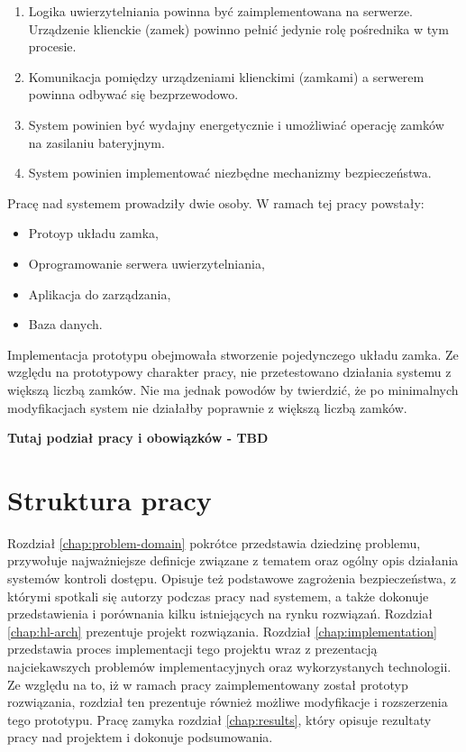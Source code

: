 		\begin{enumerate}
		    \item Logika uwierzytelniania powinna być zaimplementowana na serwerze. Urządzenie klienckie (zamek) powinno pełnić jedynie rolę pośrednika w tym procesie.
		    \item Komunikacja pomiędzy urządzeniami klienckimi (zamkami) a serwerem powinna odbywać się bezprzewodowo.
		    \item System powinien być wydajny energetycznie i umożliwiać operację zamków na zasilaniu bateryjnym.
		    \item System powinien implementować niezbędne mechanizmy bezpieczeństwa.
		\end{enumerate}

		Pracę nad systemem prowadziły dwie osoby. W ramach tej pracy powstały:
		\begin{itemize}
		    \item Protoyp układu zamka,
		    \item Oprogramowanie serwera uwierzytelniania,
		    \item Aplikacja do zarządzania,
		    \item Baza danych.
		\end{itemize}

		Implementacja prototypu obejmowała stworzenie pojedynczego układu zamka. Ze względu na prototypowy charakter pracy, nie przetestowano działania systemu z większą liczbą zamków. Nie ma jednak powodów by twierdzić, że po minimalnych modyfikacjach system nie działałby poprawnie z większą liczbą zamków.

		\textbf{Tutaj podział pracy i obowiązków - TBD}

	\section{Struktura pracy}

		Rozdział \ref{chap:problem-domain} pokrótce przedstawia dziedzinę problemu, przywołuje najważniejsze definicje związane z tematem oraz ogólny opis działania systemów kontroli dostępu. Opisuje też podstawowe zagrożenia bezpieczeństwa, z którymi spotkali się autorzy podczas pracy nad systemem, a także dokonuje przedstawienia i porównania kilku istniejących na rynku rozwiązań. Rozdział \ref{chap:hl-arch} prezentuje projekt rozwiązania. Rozdział \ref{chap:implementation} przedstawia proces implementacji tego projektu wraz z prezentacją najciekawszych problemów implementacyjnych oraz wykorzystanych technologii. Ze względu na to, iż w ramach pracy zaimplementowany został prototyp rozwiązania, rozdział ten prezentuje również możliwe modyfikacje i rozszerzenia tego prototypu. Pracę zamyka rozdział \ref{chap:results}, który opisuje rezultaty pracy nad projektem i dokonuje podsumowania.